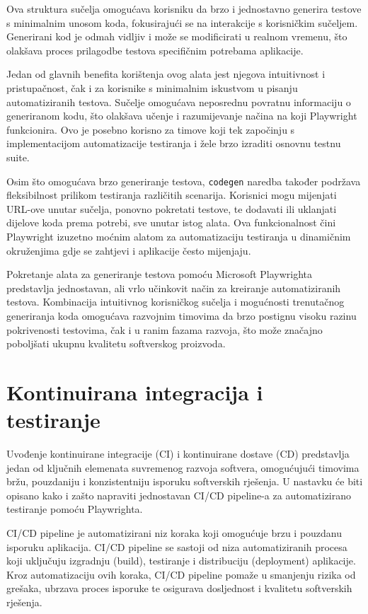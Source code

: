 Ova struktura sučelja omogućava korisniku da brzo i jednostavno generira testove s minimalnim unosom koda, fokusirajući se na interakcije s korisničkim sučeljem.
Generirani kod je odmah vidljiv i može se modificirati u realnom vremenu, što olakšava proces prilagodbe testova specifičnim potrebama aplikacije.

Jedan od glavnih benefita korištenja ovog alata jest njegova intuitivnost i pristupačnost, čak i za korisnike s minimalnim iskustvom u pisanju automatiziranih testova.
Sučelje omogućava neposrednu povratnu informaciju o generiranom kodu, što olakšava učenje i razumijevanje načina na koji Playwright funkcionira.
Ovo je posebno korisno za timove koji tek započinju s implementacijom automatizacije testiranja i žele brzo izraditi osnovnu testnu suite.

Osim što omogućava brzo generiranje testova, \texttt{codegen} naredba također podržava fleksibilnost prilikom testiranja različitih scenarija.
Korisnici mogu mijenjati URL-ove unutar sučelja, ponovno pokretati testove, te dodavati ili uklanjati dijelove koda prema potrebi, sve unutar istog alata.
Ova funkcionalnost čini Playwright izuzetno moćnim alatom za automatizaciju testiranja u dinamičnim okruženjima gdje se zahtjevi i aplikacije često mijenjaju.

Pokretanje alata za generiranje testova pomoću Microsoft Playwrighta predstavlja jednostavan, ali vrlo učinkovit način za kreiranje automatiziranih testova.
Kombinacija intuitivnog korisničkog sučelja i mogućnosti trenutačnog generiranja koda omogućava razvojnim timovima da brzo postignu visoku razinu pokrivenosti testovima, čak i u ranim fazama razvoja, što može značajno poboljšati ukupnu kvalitetu softverskog proizvoda.

\section{Kontinuirana integracija i testiranje}\label{CI/CD}
Uvođenje kontinuirane integracije (CI) i kontinuirane dostave (CD) predstavlja jedan od ključnih elemenata suvremenog razvoja softvera, omogućujući timovima bržu, pouzdaniju i konzistentniju isporuku softverskih rješenja. 
U nastavku će biti opisano kako i zašto napraviti jednostavan CI/CD pipeline-a za automatizirano testiranje pomoću Playwrighta.

CI/CD pipeline je automatizirani niz koraka koji omogućuje brzu i pouzdanu isporuku aplikacija. CI/CD pipeline se sastoji od niza automatiziranih procesa koji uključuju izgradnju (build), testiranje i distribuciju (deployment) aplikacije. 
Kroz automatizaciju ovih koraka, CI/CD pipeline pomaže u smanjenju rizika od grešaka, ubrzava proces isporuke te osigurava dosljednost i kvalitetu softverskih rješenja.

